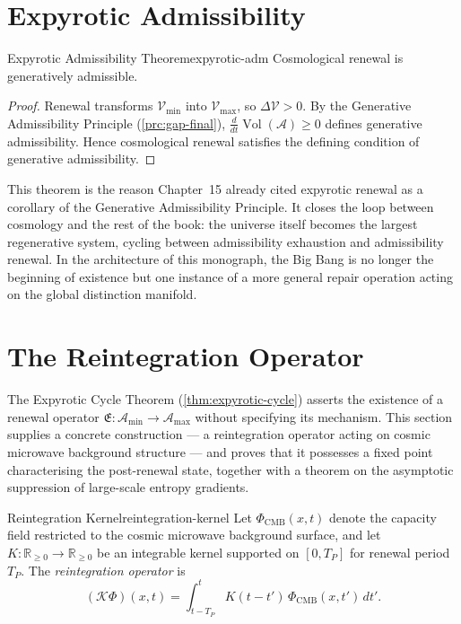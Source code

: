 \documentclass[12pt,twoside,openright]{book}
\newcommand{\Vol}{\operatorname{Vol}}
\begin{document}
\section{Expyrotic Admissibility}
\label{sec:ch18-admissibility}

\begin{theorem}{Expyrotic Admissibility Theorem}{expyrotic-adm}
  Cosmological renewal is generatively admissible.
  \parencite{steinhardt2002,penrose2010}
\end{theorem}

\begin{proof}
  Renewal transforms $\mathcal{V}_{\min}$ into
  $\mathcal{V}_{\max}$, so $\Delta\mathcal{V} > 0$. By the
  Generative Admissibility Principle
  (\cref{prc:gap-final}), $\frac{d}{dt}\Vol(\mathcal{A}) \ge 0$
  defines generative admissibility. Hence cosmological
  renewal satisfies the defining condition of generative
  admissibility.
\end{proof}

This theorem is the reason Chapter~15 already cited
expyrotic renewal as a corollary of the Generative
Admissibility Principle. It closes the loop between
cosmology and the rest of the book: the universe itself
becomes the largest regenerative system, cycling between
admissibility exhaustion and admissibility renewal. In the
architecture of this monograph, the Big Bang is no longer
the beginning of existence but one instance of a more
general repair operation acting on the global distinction
manifold.

\section{The Reintegration Operator}
\label{sec:ch18-reintegration}

The Expyrotic Cycle Theorem (\cref{thm:expyrotic-cycle})
asserts the existence of a renewal operator
$\mathfrak{E}:\mathcal{A}_{\min}\to\mathcal{A}_{\max}$
without specifying its mechanism. This section supplies a
concrete construction --- a reintegration operator acting
on cosmic microwave background structure --- and proves that
it possesses a fixed point characterising the
post-renewal state, together with a theorem on the
asymptotic suppression of large-scale entropy gradients.

\begin{definition}{Reintegration Kernel}{reintegration-kernel}
  Let $\Phi_\mathrm{CMB}(x,t)$ denote the capacity field
  restricted to the cosmic microwave background surface, and
  let $K:\mathbb{R}_{\ge0}\to\mathbb{R}_{\ge0}$ be an
  integrable kernel supported on $[0,T_P]$ for renewal
  period $T_P$. The \emph{reintegration operator} is
  \[
    (\mathcal{K}\Phi)(x,t)
    = \int_{t-T_P}^{t} K(t-t')\, \Phi_\mathrm{CMB}(x,t')\, dt'.
  \]
\end{definition}
\end{document}
